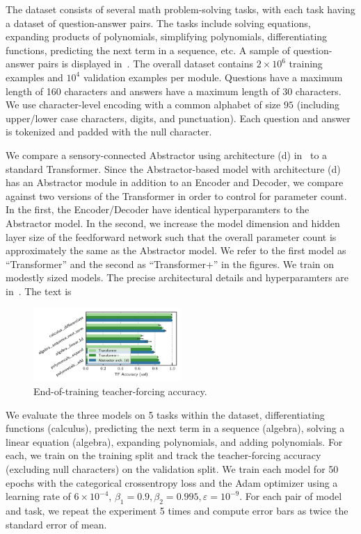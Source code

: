 The dataset consists of several math problem-solving tasks, with each task having a dataset of question-answer pairs. The tasks include solving equations, expanding products of polynomials, simplifying polynomials, differentiating functions, predicting the next term in a sequence, etc. A sample of question-answer pairs is displayed in~. The overall dataset contains $2 \times 10^6$ training examples and $10^4$ validation examples per module. Questions have a maximum length of 160 characters and answers have a maximum length of 30 characters. We use character-level encoding with a common alphabet of size $95$ (including upper/lower case characters, digits, and punctuation). Each question and answer is tokenized and padded with the null character.

We compare a sensory-connected Abstractor using architecture (d) in~ to a standard Transformer. Since the Abstractor-based model with architecture (d) has an Abstractor module in addition to an Encoder and Decoder, we compare against two versions of the Transformer in order to control for parameter count. In the first, the Encoder/Decoder have identical hyperparamters to the Abstractor model. In the second, we increase the model dimension and hidden layer size of the feedforward network such that the overall parameter count is approximately the same as the Abstractor model. We refer to the first model as ``Transformer'' and the second as ``Transformer+'' in the figures. We train on modestly sized models. The precise architectural details and hyperparamters are in~. The text is 

\begin{figure}
    \centering
    \includegraphics[width=0.5\textwidth]{figures/experiments/math_metrics.pdf}
    \caption{\footnotesize End-of-training teacher-forcing accuracy.}\label{fig:math_metrics}
\end{figure}

We evaluate the three models on 5 tasks within the dataset, differentiating functions (calculus), predicting the next term in a sequence (algebra), solving a linear equation (algebra), expanding polynomials, and adding polynomials. For each, we train on the training split and track the teacher-forcing accuracy (excluding null characters) on the validation split. We train each model for 50 epochs with the categorical crossentropy loss and the Adam optimizer using a learning rate of $6 \times 10^{-4}$, $\beta_1 = 0.9, \beta_2 = 0.995, \varepsilon = 10^{-9}$. For each pair of model and task, we repeat the experiment 5 times and compute error bars as twice the standard error of mean.

